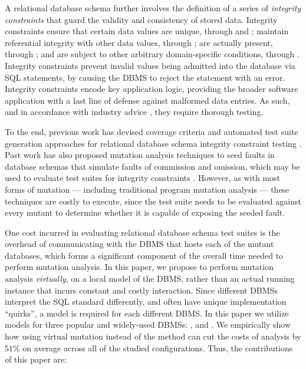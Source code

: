 \begin{sloppypar}
A relational database schema further involves the definition of a series of {\it integrity constraints} that guard the validity and consistency of stored data. Integrity constraints ensure that certain data values are unique, through \PKCs and \UCs; maintain referential integrity with other data values, through \FKCs; are actually present, through \NNCs; and are subject to other arbitrary domain-specific conditions, through \CCs. Integrity constraints prevent invalid values being admitted into the database via SQL \INSERT statements, by causing the DBMS to reject the statement with an error. Integrity constraints encode key application logic, providing the broader software application with a last line of defense against malformed data entries. As such, and in accordance with industry advice \cite{DzoneDatabaseTesting}, they require thorough testing.
\end{sloppypar}

To the end, previous work has devised coverage criteria and automated test suite generation approaches for relational database schema integrity constraint testing \cite{Kapfhammer2013,McMinn2015}. Past work has also proposed mutation analysis techniques to seed faults in database schemas that simulate faults of commission and omission, which may be used to evaluate test suites for integrity constraints \cite{Kapfhammer2007,Wright2013}.
%
However, as with most forms of mutation --- including traditional program mutation analysis --- these techniques are costly to execute, since the test suite needs to be evaluated against every mutant to determine whether it is capable of exposing the seeded fault.



One cost incurred in evaluating relational database schema test suites is the overhead of communicating with the DBMS that hosts each of the mutant databases, which forms a significant component of the overall time needed to perform mutation analysis. In this paper, we propose to perform mutation analysis {\it virtually}, on a local model of the DBMS, rather than an actual running instance that incurs constant and costly interaction. Since different DBMSs interpret the SQL standard differently, and often have unique implementation ``quirks'', a model is required for each different DBMS. In this paper we utilize models for three popular and widely-used DBMSs: \HyperSQL, \Postgres and \SQLite. We empirically show how using virtual mutation instead of the \Original method can cut the costs of analysis by $51\%$ on average across all of the studied configurations. Thus, the contributions of this paper are:

